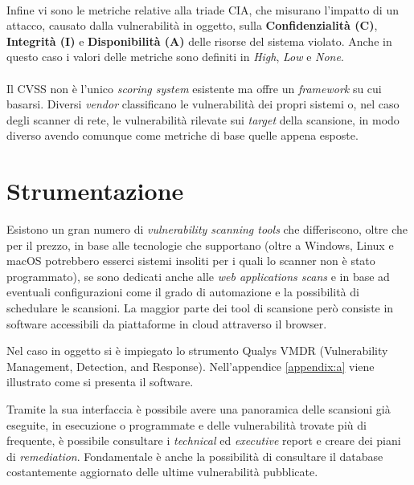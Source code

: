 \documentclass[target=bach,aauheader=]{thud}
\begin{document}
\paragraph{} Infine vi sono le metriche relative alla triade CIA, che misurano l'impatto di un attacco, causato dalla vulnerabilità in oggetto, sulla \textbf{Confidenzialità (C)}, \textbf{Integrità (I)} e \textbf{Disponibilità (A)} delle risorse del sistema violato.
Anche in questo caso i valori delle metriche sono definiti in \textit{High}, \textit{Low} e \textit{None}.

\paragraph{} Il CVSS non è l'unico \textit{scoring system} esistente ma offre un \textit{framework} su cui basarsi. Diversi \textit{vendor} classificano le vulnerabilità dei propri sistemi o, nel caso degli scanner di rete, le vulnerabilità rilevate sui \textit{target} della scansione, in modo diverso avendo comunque come metriche di base quelle appena esposte.

\section{Strumentazione}
Esistono un gran numero di \textit{vulnerability scanning tools} che differiscono, oltre che per il prezzo, in base alle tecnologie che supportano (oltre a Windows, Linux e macOS potrebbero esserci sistemi insoliti per i quali lo scanner non è stato programmato), se sono dedicati anche alle \textit{web applications scans} e in base ad eventuali configurazioni come il grado di automazione e la possibilità di schedulare le scansioni. La maggior parte dei tool di scansione però consiste in software accessibili da piattaforme in cloud attraverso il browser.

Nel caso in oggetto si è impiegato lo strumento Qualys VMDR (Vulnerability Management, Detection, and Response). Nell'appendice \ref{appendix:a} viene illustrato come si presenta il software.

Tramite la sua interfaccia è possibile avere una panoramica delle scansioni già eseguite, in esecuzione o programmate e delle vulnerabilità trovate più di frequente, è possibile consultare i \textit{technical} ed \textit{executive} report e creare dei piani di \textit{remediation}. Fondamentale è anche la possibilità di consultare il database costantemente aggiornato delle ultime vulnerabilità pubblicate.
\end{document}
